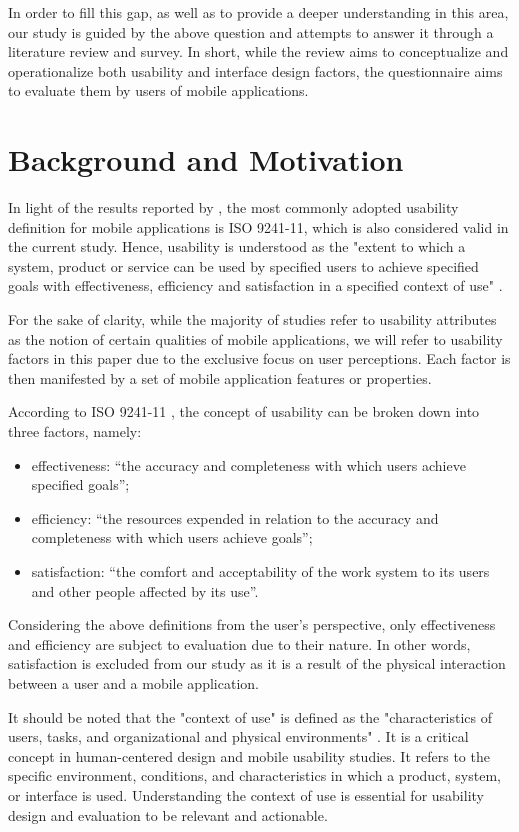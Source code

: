 \documentclass[preprint,12pt]{elsarticle}
\begin{document}
In order to fill this gap, as well as to provide a deeper understanding in this area, our study is guided by the above question and attempts to answer it through a literature review and survey. In short, while the review aims to conceptualize and operationalize both usability and interface design factors, the questionnaire aims to evaluate them by users of mobile applications. 

\section{Background and Motivation}
\label{Background}
In light of the results reported by \cite{weichbroth2020usability}, the most commonly adopted usability definition for mobile applications is ISO 9241-11, which is also considered valid in the current study.
Hence, usability is understood as the "extent to which a system, product or service can be used by specified users to achieve specified goals with effectiveness, efficiency and satisfaction in a specified context of use" \cite{ISO9242-11}.

For the sake of clarity, while the majority of studies refer to usability attributes as the notion of certain qualities of mobile applications, we will refer to usability factors in this paper due to the exclusive focus on user perceptions. Each factor is then manifested by a set of mobile application features or properties. 

According to ISO 9241-11 \cite{ISO9242-11}, the concept of usability can be broken down into three factors, namely:
\begin{itemize}
    \item effectiveness: “the accuracy and completeness with which users achieve specified goals”;
    \item efficiency: “the resources expended in relation to the accuracy and completeness with which users achieve goals”;
    \item satisfaction: “the comfort and acceptability of the work system to its users and other people affected by its use”.
\end{itemize}

Considering the above definitions from the user's perspective, only effectiveness and efficiency are subject to evaluation due to their nature. In other words, satisfaction is excluded from our study as it is a result of the physical interaction between a user and a mobile application.

It should be noted that the "context of use" is defined as the "characteristics of users, tasks, and organizational and physical environments" \cite{ISO9242-11}. It is a critical concept in human-centered design and mobile usability studies. It refers to the specific environment, conditions, and characteristics in which a product, system, or interface is used. Understanding the context of use is essential for usability design and evaluation to be relevant and actionable.
\end{document}
